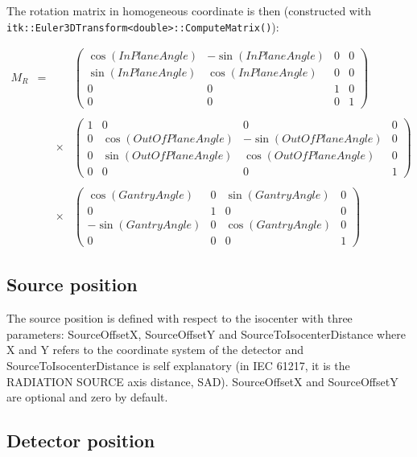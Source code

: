\documentclass{article}
\begin{document}
The rotation matrix in homogeneous coordinate is then (constructed with\\ \verb+itk::Euler3DTransform<double>::ComputeMatrix()+):

$$
\begin{array}{lcll}
  M_R & = & & %
  \begin{pmatrix}
    \cos(InPlaneAngle) & -\sin(InPlaneAngle) & 0 & 0\\
    \sin(InPlaneAngle) & \cos(InPlaneAngle) & 0 & 0\\
    0 & 0 & 1 & 0\\
    0 & 0 & 0 & 1
  \end{pmatrix} \\
  \\ & & \times & %
  \begin{pmatrix}
    1 & 0 & 0 & 0\\
    0 & \cos(OutOfPlaneAngle) & -\sin(OutOfPlaneAngle) & 0\\
    0 & \sin(OutOfPlaneAngle) & \cos(OutOfPlaneAngle) & 0\\
    0 & 0 & 0 & 1
  \end{pmatrix} \\
  \\ & & \times & %
  \begin{pmatrix}
    \cos(GantryAngle) & 0 & \sin(GantryAngle) & 0 \\
    0 & 1 & 0 & 0 \\
    -\sin(GantryAngle) & 0 & \cos(GantryAngle) & 0 \\
    0 & 0 & 0 & 1
  \end{pmatrix}
\end{array}
$$

\subsection{Source position}

The source position is defined with respect to the isocenter with three parameters: SourceOffsetX, SourceOffsetY and SourceToIsocenterDistance where X and Y refers to the coordinate system of the detector and SourceToIsocenterDistance is self explanatory (in IEC 61217, it is the RADIATION SOURCE axis distance, SAD). SourceOffsetX and SourceOffsetY are optional and zero by default.

\subsection{Detector position}
\end{document}
